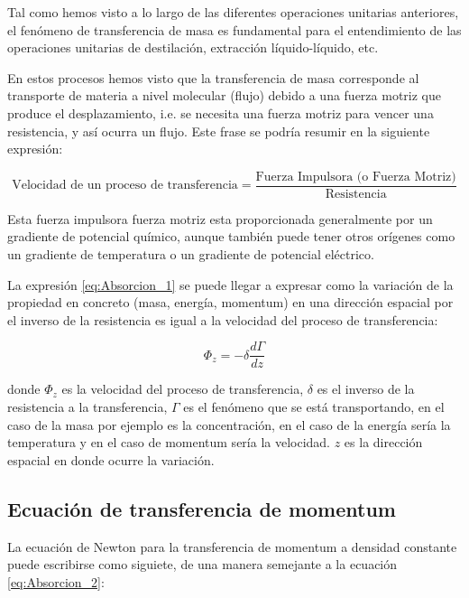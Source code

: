 \documentclass[11pt]{book}
\begin{document}
Tal como hemos visto a lo largo de las diferentes operaciones unitarias anteriores, el fenómeno de transferencia de masa es fundamental para el entendimiento de las operaciones unitarias de destilación, extracción líquido-líquido, etc. 

En estos procesos hemos visto que la transferencia de masa corresponde al transporte de materia a nivel molecular (flujo) debido a una fuerza motriz que produce el desplazamiento, i.e. se necesita una fuerza motriz para vencer una resistencia, y así ocurra un flujo. Este frase se podría resumir en la siguiente expresión:

\begin{equation}
    \label{eq:Absorcion_1}
    \textrm{Velocidad de un proceso de transferencia} = \frac{\textrm{Fuerza Impulsora (o Fuerza Motriz)}}{\textrm{Resistencia}}
\end{equation}

Esta fuerza impulsora fuerza motriz esta proporcionada generalmente por un gradiente de potencial químico, aunque también puede tener otros orígenes como un gradiente de temperatura o un gradiente de potencial eléctrico.

La expresión \ref{eq:Absorcion_1} se puede llegar a expresar como la variación de la propiedad en concreto (masa, energía, momentum) en una dirección espacial por el inverso de la resistencia es igual a la velocidad del proceso de transferencia:

\begin{equation}
    \label{eq:Absorcion_2}
    \Phi_z = -\delta \frac{d\Gamma}{dz}
\end{equation}

donde $\Phi_z$ es la velocidad del proceso de transferencia, $\delta$ es el inverso de la resistencia a la transferencia, $\Gamma$ es el fenómeno que se está transportando, en el caso de la masa por ejemplo es la concentración, en el caso de la energía sería la temperatura y en el caso de momentum sería la velocidad. $z$ es la dirección espacial en donde ocurre la variación.

\subsection{Ecuación de transferencia de momentum}

La ecuación de Newton para la transferencia de momentum a densidad constante puede escribirse como siguiete, de una manera semejante a la ecuación \ref{eq:Absorcion_2}:
\end{document}
